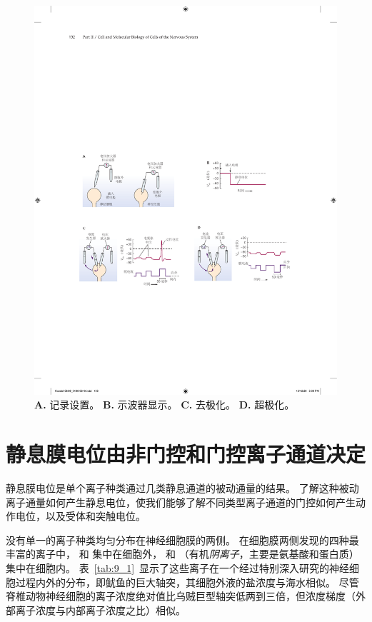 \begin{figure}[htbp]
	\centering
	\includegraphics[width=1.0\linewidth]{chap09/fig_9_2}
	\caption{\textbf{A.} 记录设置。
	\textbf{B.} 示波器显示。
	\textbf{C.} 去极化。
	\textbf{D.} 超极化。}
	\label{fig:9_2}
\end{figure}



\section{静息膜电位由非门控和门控离子通道决定}

静息膜电位是单个离子种类通过几类静息通道的被动通量的结果。
了解这种被动离子通量如何产生静息电位，使我们能够了解不同类型离子通道的门控如何产生动作电位，以及受体和突触电位。


没有单一的离子种类均匀分布在神经细胞膜的两侧。
在细胞膜两侧发现的四种最丰富的离子中， 和  集中在细胞外， 和 （有机\textit{阴离子}，主要是氨基酸和蛋白质）集中在细胞内。
表~\ref{tab:9_1}~显示了这些离子在一个经过特别深入研究的神经细胞过程内外的分布，即鱿鱼的巨大轴突，其细胞外液的盐浓度与海水相似。
尽管脊椎动物神经细胞的离子浓度绝对值比乌贼巨型轴突低两到三倍，但浓度梯度（外部离子浓度与内部离子浓度之比）相似。


